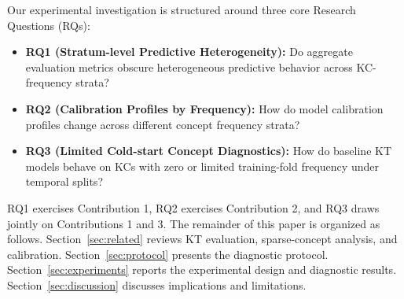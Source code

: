 Our experimental investigation is structured around three core Research Questions (RQs):
\begin{itemize}
    \item \textbf{RQ1 (Stratum-level Predictive Heterogeneity):} Do aggregate evaluation metrics obscure heterogeneous predictive behavior across KC-frequency strata?
    \item \textbf{RQ2 (Calibration Profiles by Frequency):} How do model calibration profiles change across different concept frequency strata?
    \item \textbf{RQ3 (Limited Cold-start Concept Diagnostics):} How do baseline KT models behave on KCs with zero or limited training-fold frequency under temporal splits?
\end{itemize}

RQ1 exercises Contribution 1, RQ2 exercises Contribution 2, and RQ3 draws jointly on Contributions 1 and 3. The remainder of this paper is organized as follows. Section~\ref{sec:related} reviews KT evaluation, sparse-concept analysis, and calibration. Section~\ref{sec:protocol} presents the diagnostic protocol. Section~\ref{sec:experiments} reports the experimental design and diagnostic results. Section~\ref{sec:discussion} discusses implications and limitations.
